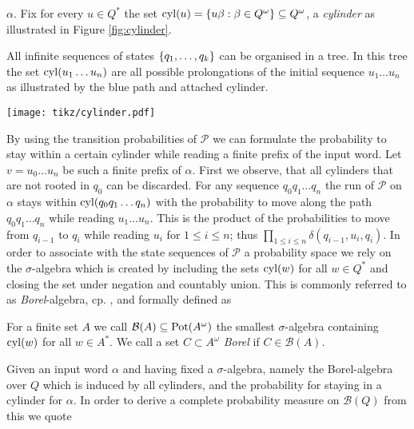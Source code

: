 $\alpha$. Fix for every $u\in Q^{*}$ the set 
$\operatorname{cyl}(u) = \left\{u\beta : \beta\in Q^{\omega}\right\}\subseteq Q^{\omega}$, a 
\emph{cylinder} as illustrated in Figure \ref{fig:cylinder}.
\begin{drawing}
  \caption{All infinite sequences of states $\left\{q_{1},\dots, q_{k}\right\}$ can be
  organised in a tree. In this tree the set $\operatorname{cyl}(u_{1}\dots u_{n})$ are all 
  possible prolongations of the initial sequence $u_{1}\dots u_{n}$ as 
  illustrated by the blue path and attached cylinder.}
  \label{fig:cylinder}
  \begin{center}
    \texttt{[image: tikz/cylinder.pdf]}
  \end{center}
\end{drawing}
By using the transition probabilities of $\mathcal{P}$ we can formulate the 
probability to stay within a certain cylinder while reading a finite prefix of 
the input word. Let $v = u_{0}\dots u_{n}$ be such a finite prefix of $\alpha$.
First we observe, that all cylinders that are not rooted in $q_{0}$ can be 
discarded. For any sequence $q_{0}q_{1}\dots q_{n}$ the run of $\mathcal{P}$
on $\alpha$ stays within $\operatorname{cyl}(q_{0}q_{1}\dots q_{n})$ with the probability to
move along the path $q_{0}q_{1}\dots q_{n}$ while reading $u_{1}\dots u_{n}$.
This is the product of the probabilities to move from $q_{i-1}$ to $q_{i}$
while reading $u_{i}$ for $1\leq i\leq n$; thus 
$\prod_{1\leq i\leq n}\delta(q_{i-1},u_{i},q_{i})$. In order to associate with
the state sequences of $\mathcal{P}$ a probability space we rely on the 
$\sigma$-algebra which is created by including the sets $\operatorname{cyl}(w)$ for all 
$w\in Q^{*}$ and closing the set under negation and countably union. This is
commonly referred to as \emph{Borel}-algebra, cp. \cite{}, and formally 
defined as
\begin{definition}
  For a finite set $A$ we call $\mathcal{B}(A)\subseteq\operatorname{Pot}(A^{\omega})$ the 
  smallest $\sigma$-algebra containing $\operatorname{cyl}(w)$ for all $w\in A^{*}$. We call
  a set $C\subset A^{\omega}$ \emph{Borel} if $C\in\mathcal{B}(A)$.
\end{definition}
Given an input word $\alpha$ and having fixed a $\sigma$-algebra, namely the
Borel-algebra over $Q$ which is induced by all cylinders, and the probability 
for staying in a cylinder for $\alpha$. In order to derive a complete 
probability measure on $\mathcal{B}(Q)$ from this we quote
